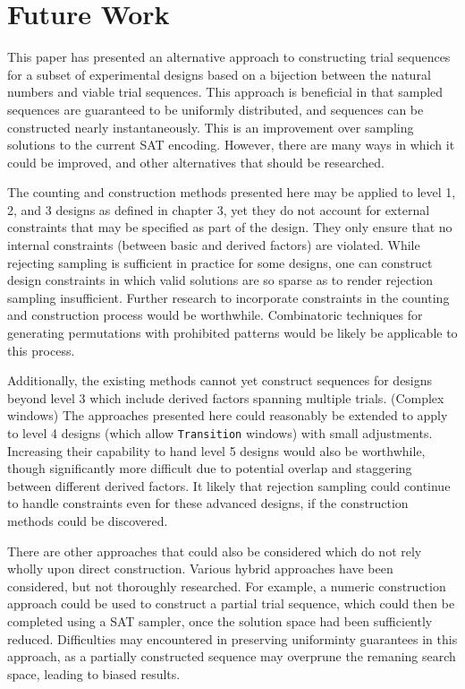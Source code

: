 
\chapter{Future Work}

This paper has presented an alternative approach to constructing trial sequences for a subset of experimental designs based on a bijection between the natural numbers and viable trial sequences. This approach is beneficial in that sampled sequences are guaranteed to be uniformly distributed, and sequences can be constructed nearly instantaneously. This is an improvement over sampling solutions to the current SAT encoding. However, there are many ways in which it could be improved, and other alternatives that should be researched.

The counting and construction methods presented here may be applied to level 1, 2, and 3 designs as defined in chapter 3, yet they do not account for external constraints that may be specified as part of the design. They only ensure that no internal constraints (between basic and derived factors) are violated. While rejecting sampling is sufficient in practice for some designs, one can construct design constraints in which valid solutions are so sparse as to render rejection sampling insufficient. Further research to incorporate constraints in the counting and construction process would be worthwhile. Combinatoric techniques for generating permutations with prohibited patterns would be likely be applicable to this process.

Additionally, the existing methods cannot yet construct sequences for designs beyond level 3 which include derived factors spanning multiple trials. (Complex windows) The approaches presented here could reasonably be extended to apply to level 4 designs (which allow \texttt{Transition} windows) with small adjustments. Increasing their capability to hand level 5 designs would also be worthwhile, though significantly more difficult due to potential overlap and staggering between different derived factors. It likely that rejection sampling could continue to handle constraints even for these advanced designs, if the construction methods could be discovered.

There are other approaches that could also be considered which do not rely wholly upon direct construction. Various hybrid approaches have been considered, but not thoroughly researched. For example, a numeric construction approach could be used to construct a partial trial sequence, which could then be completed using a SAT sampler, once the solution space had been sufficiently reduced. Difficulties may encountered in preserving uniforminty guarantees in this approach, as a partially constructed sequence may overprune the remaning search space, leading to biased results.

